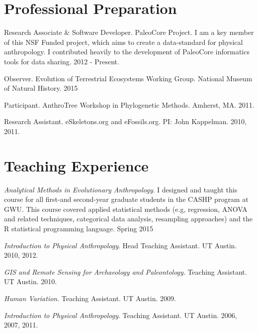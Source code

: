 \documentclass{article}
\begin{document}
\section*{Professional Preparation}
\begin{description*}

\item[] Research Associate \& Software Developer. PaleoCore Project. I am a key member of this NSF Funded project, which aims to create a data-standard for physical anthropology. I contributed heavily to the development of PaleoCore informatics tools for data sharing. 2012 - Present.

\item[] Observer. Evolution of Terrestrial Ecosystems Working Group. National Museum of Natural History. 2015

\item[] Participant. AnthroTree Workshop in Phylogenetic Methods. Amherst, MA. 2011.

\item[] Research Assistant. eSkeletons.org and eFossils.org. PI: John Kappelman. 2010, 2011.

\end{description*}

\section*{Teaching Experience}
\begin{description*}
\item[] \emph{Analytical Methods in Evolutionary Anthropology}. I designed and taught this course for all first-and second-year graduate students in the CASHP program at GWU. This course covered applied statistical methods (e.g, regression, ANOVA and related techniques, categorical data analysis, resampling approaches) and the R statistical programming language. Spring 2015

\item[] \emph{Introduction to Physical Anthropology}. Head Teaching Assistant. UT Austin. 2010, 2012.

\item[] \emph{GIS and Remote Sensing for Archaeology and Paleontology}. Teaching Assistant.  UT Austin. 2010.

\item[] \emph{Human Variation}. Teaching Assistant. UT Austin. 2009.

\item[] \emph{Introduction to Physical Anthropology}. Teaching Assistant. UT Austin. 2006, 2007, 2011.
\end{description*}
\end{document}
